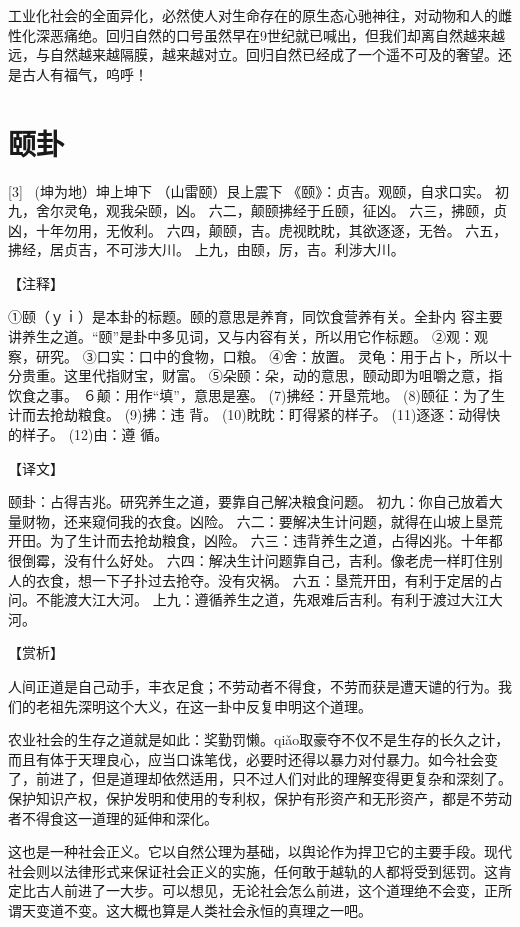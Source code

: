 \documentclass[12pt,UTF8]{ctexbook}
\begin{document}
工业化社会的全面异化，必然使人对生命存在的原生态心驰神往，对动物和人的雌性化深恶痛绝。回归自然的口号虽然早在9世纪就已喊出，但我们却离自然越来越远，与自然越来越隔膜，越来越对立。回归自然已经成了一个遥不可及的奢望。还是古人有福气，呜呼！

\chapter{颐卦}
[3] \ (坤为地）坤上坤下
（山雷颐）艮上震下
《颐》：贞吉。观颐，自求口实。
初九，舍尔灵龟，观我朵颐，凶。
六二，颠颐拂经于丘颐，征凶。
六三，拂颐，贞凶，十年勿用，无攸利。
六四，颠颐，吉。虎视眈眈，其欲逐逐，无咎。
六五，拂经，居贞吉，不可涉大川。
上九，由颐，厉，吉。利涉大川。

【注释】

①颐（ｙｉ）是本卦的标题。颐的意思是养育，同饮食营养有关。全卦内 容主要讲养生之道。“颐”是卦中多见词，又与内容有关，所以用它作标题。
②观：观察，研究。
③口实：口中的食物，口粮。
④舍：放置。 灵龟：用于占卜，所以十分贵重。这里代指财宝，财富。
⑤朵颐：朵，动的意思，颐动即为咀嚼之意，指饮食之事。
６颠：用作“填”，意思是塞。
(7)拂经：开垦荒地。
(8)颐征：为了生计而去抢劫粮食。
(9)拂：违 背。
(10)眈眈：盯得紧的样子。
(11)逐逐：动得快的样子。
(12)由：遵 循。

【译文】

颐卦：占得吉兆。研究养生之道，要靠自己解决粮食问题。
初九：你自己放着大量财物，还来窥伺我的衣食。凶险。
六二：要解决生计问题，就得在山坡上垦荒开田。为了生计而去抢劫粮食，凶险。
六三：违背养生之道，占得凶兆。十年都很倒霉，没有什么好处。
六四：解决生计问题靠自己，吉利。像老虎一样盯住别人的衣食，想一下子扑过去抢夺。没有灾祸。
六五：垦荒开田，有利于定居的占问。不能渡大江大河。
上九：遵循养生之道，先艰难后吉利。有利于渡过大江大河。

【赏析】

人间正道是自己动手，丰衣足食；不劳动者不得食，不劳而获是遭天谴的行为。我们的老祖先深明这个大义，在这一卦中反复申明这个道理。

农业社会的生存之道就是如此：奖勤罚懒。qiǎo取豪夺不仅不是生存的长久之计，而且有体于天理良心，应当口诛笔伐，必要时还得以暴力对付暴力。如今社会变了，前进了，但是道理却依然适用，只不过人们对此的理解变得更复杂和深刻了。保护知识产权，保护发明和使用的专利权，保护有形资产和无形资产，都是不劳动者不得食这一道理的延伸和深化。

这也是一种社会正义。它以自然公理为基础，以舆论作为捍卫它的主要手段。现代社会则以法律形式来保证社会正义的实施，任何敢于越轨的人都将受到惩罚。这肯定比古人前进了一大步。可以想见，无论社会怎么前进，这个道理绝不会变，正所谓天变道不变。这大概也算是人类社会永恒的真理之一吧。
\end{document}
